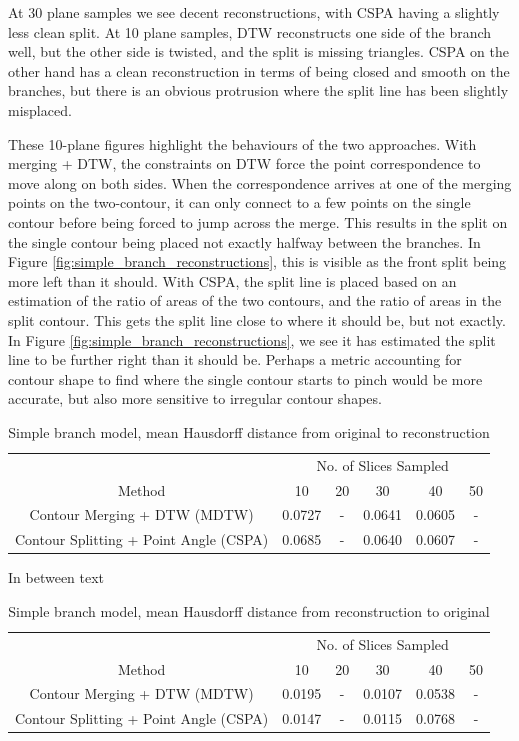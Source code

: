 \documentclass[11p, titlepage]{article}
\begin{document}
At 30 plane samples we see decent reconstructions, with CSPA having a slightly less clean split. At 10 plane samples, DTW reconstructs one side of the branch well, but the other side is twisted, and the split is missing triangles. CSPA on the other hand has a clean reconstruction in terms of being closed and smooth on the branches, but there is an obvious protrusion where the split line has been slightly misplaced. 

These 10-plane figures highlight the behaviours of the two approaches. With merging + DTW, the constraints on DTW force the point correspondence to move along on both sides. When the correspondence arrives at one of the merging points on the two-contour, it can only connect to a few points on the single contour before being forced to jump across the merge. This results in the split on the single contour being placed not exactly halfway between the branches. In Figure \ref{fig:simple_branch_reconstructions}, this is visible as the front split being more left than it should. With CSPA, the split line is placed based on an estimation of the ratio of areas of the two contours, and the ratio of areas in the split contour. This gets the split line close to where it should be, but not exactly. In Figure \ref{fig:simple_branch_reconstructions}, we see it has estimated the split line to be further right than it should be. Perhaps a metric accounting for contour shape to find where the single contour starts to pinch would be more accurate, but also more sensitive to irregular contour shapes.

\begin{table}[h!]
\begin{tabular}{ | c | c | c | c | c | c | }
\hline
& \multicolumn{5}{c|}{No. of Slices Sampled} \\
\cline{2-6}
Method & 10 & 20 & 30 & 40 & 50 \\
\hline
Contour Merging + DTW (MDTW) & 0.0727 & - & 0.0641 & 0.0605 & - \\
Contour Splitting + Point Angle (CSPA) & 0.0685 & - & 0.0640 & 0.0607 & - \\
\hline
\end{tabular}
\caption{Simple branch model, mean Hausdorff distance from original to reconstruction}
\label{table:simple_branch_forward}
\end{table}

In between text

\begin{table}[h!]
\begin{tabular}{ | c | c | c | c | c | c | }
\hline
& \multicolumn{5}{c|}{No. of Slices Sampled} \\
\cline{2-6}
Method & 10 & 20 & 30 & 40 & 50 \\
\hline
Contour Merging + DTW (MDTW) & 0.0195 & - & 0.0107 & 0.0538 & - \\
Contour Splitting + Point Angle (CSPA) & 0.0147 & - & 0.0115 & 0.0768 & - \\
\hline
\end{tabular}
\caption{Simple branch model, mean Hausdorff distance from reconstruction to original}
\label{table:simple_branch_reverse}
\end{table}
\end{document}
